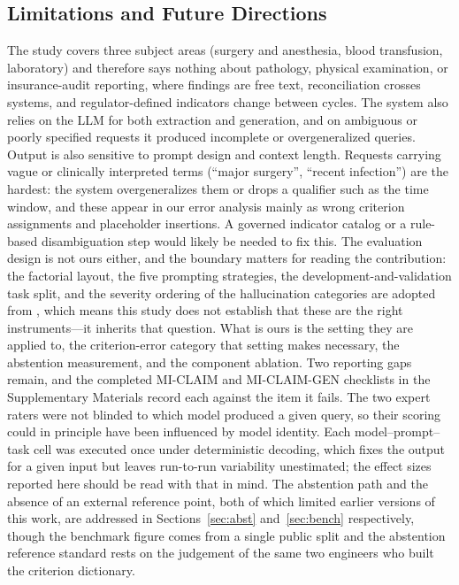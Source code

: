 \documentclass[applsci,article,submit,pdftex,oneauthor]{Definitions/mdpi}
\begin{document}
\subsection{Limitations and Future Directions}
The study covers three subject areas (surgery and anesthesia, blood transfusion, laboratory) and therefore says nothing about pathology, physical examination, or insurance-audit reporting, where findings are free text, reconciliation crosses systems, and regulator-defined indicators change between cycles. The system also relies on the LLM for both extraction and generation, and on ambiguous or poorly specified requests it produced incomplete or overgeneralized queries.
Output is also sensitive to prompt design and context length. Requests carrying vague or clinically interpreted terms (``major surgery'', ``recent infection'') are the hardest: the system overgeneralizes them or drops a qualifier such as the time window, and these appear in our error analysis mainly as wrong criterion assignments and placeholder insertions. A governed indicator catalog or a rule-based disambiguation step would likely be needed to fix this. The evaluation design is not ours either, and the boundary matters for reading the contribution: the factorial layout, the five prompting strategies, the development-and-validation task split, and the severity ordering of the hallucination categories are adopted from \cite{lee2025}, which means this study does not establish that these are the right instruments---it inherits that question. What is ours is the setting they are applied to, the criterion-error category that setting makes necessary, the abstention measurement, and the component ablation. Two reporting gaps remain, and the completed MI-CLAIM and MI-CLAIM-GEN checklists in the Supplementary Materials record each against the item it fails. The two expert raters were not blinded to which model produced a given query, so their scoring could in principle have been influenced by model identity. Each model--prompt--task cell was executed once under deterministic decoding, which fixes the output for a given input but leaves run-to-run variability unestimated; the effect sizes reported here should be read with that in mind. The abstention path and the absence of an external reference point, both of which limited earlier versions of this work, are addressed in Sections~\ref{sec:abst} and~\ref{sec:bench} respectively, though the benchmark figure comes from a single public split and the abstention reference standard rests on the judgement of the same two engineers who built the criterion dictionary.
\end{document}
